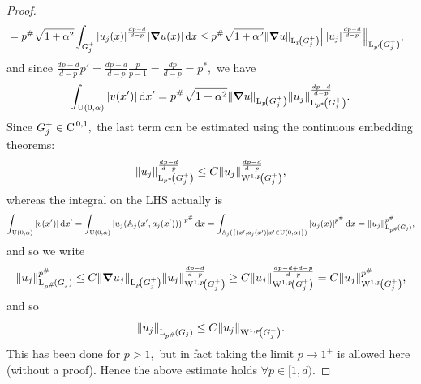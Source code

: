 \documentclass{article}
\begin{document}
\begin{proof}
\begin{align*}
								& = p^{\#}\sqrt{1+\alpha^{2}}\int_{G_j^{+}}\abs{u_j(x)}^{\frac{dp-d}{d-p}}\abs{\grad u(x)}\dd{x} \leq p^{\#}\sqrt{1+\alpha^{2}} \norm{\grad u}_{\LpSet[p]{G_j^+}} \norm{\abs{u_j}^{\frac{dp-d}{d-p}}}_{\LpSet[p']{G_j^{+}}},
	\end{align*}
	and since $\frac{dp-d}{d-p} p' = \frac{dp-d}{d-p} \frac{p}{p-1} = \frac{dp}{d-p} = p^{*},$ we have	
	\[
		\int_{\text{U}(0,\alpha)}\abs{v(x')}\dd{x'} = p^{\#}\sqrt{1+\alpha^{2}}\norm{\grad u}_{\LpSet[p]{G_j^{+}}}\norm{u_j}_{\LpSet[p^{*}]{G_j^{+}}}^{\frac{dp-d}{d-p}}.
	\]
	Since $G_j^{+} \in \text{C}^{\!\,\, 0,1},$ the last term can be estimated using the continuous embedding theorems:
	\[
		\norm{u_j}_{\LpSet[p^{*}]{G_j^+}}^{\frac{dp-d}{d-p}} \leq C \norm{u_j}_{\WkpSet[1][p]{G_j^+}}^{\frac{dp-d}{d-p}},
	\]
	whereas the integral on the LHS actually is
	\[
		\int_{\text{U}(0,\alpha)}\abs{v(x')}\dd{x'} = \int_{\text{U}(0,\alpha)}\abs{u_j\qty(\tensorq{A}_j\qty(x',a_j(x')))}^{p^{\#}}\dd{x} = \int_{\tensorq{A}_j\qty(\qty{(x',a_j(x')|x' \in \text{U}(0,\alpha)})}\abs{u_j(x)}^{p^{\#}}\dd{x} = \norm{u_j}_{\LpSet[p^{\#}]{G_j}}^{p^{\#}}, 
	\]
	and so we write
	\[
		\norm{u_j}_{\LpSet[p^{\#}]{G_j}}^{p^{\#}}\leq C \norm{\grad u_j}_{\LpSet[p]{G_j^+}} \norm{u_j}_{\WkpSet[1][p]{G_j^+}}^{\frac{dp-d}{d-p}} \geq C \norm{u_j}_{\WkpSet[1][p]{G_j^+}}^\frac{dp-d+d-p}{d-p} = C \norm{u_j}_{\WkpSet[1][p]{G^+_j}}^{p^{\#}},
	\]
	and so
	\[
		\norm{u_j}_{\LpSet[p^{\#}]{G_j}}\leq C \norm{u_j}_{\WkpSet[1][p]{G_j^+}}.
	\]
	This has been done for $p>1,$ but in fact taking the limit $p \to 1^+$ is allowed here (without a proof). Hence the above estimate holds $\forall p \in [1,d).$


\end{proof}
\end{document}
